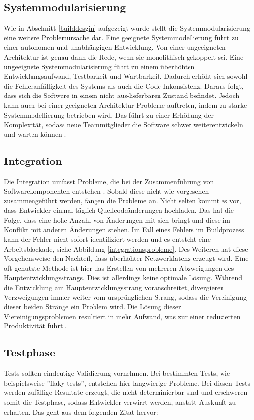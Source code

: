 \subsection{Systemmodularisierung}  \label{Systemmodularisierung}
Wie in Abschnitt \ref{builddesgin} aufgezeigt wurde stellt die Systemmodularisierung eine weitere Problemursache dar. Eine geeignete Systemmodellierung führt zu einer autonomen und unabhängigen Entwicklung. Von einer ungeeigneten Architektur ist genau dann die Rede, wenn sie monolithisch gekoppelt sei. Eine ungeeignete Systemmodularisierung führt zu einem überhöhten Entwicklungsaufwand, Testbarkeit und Wartbarkeit. Dadurch erhöht sich sowohl die Fehleranfälligkeit des Systems als auch die Code-Inkonsistenz. Daraus folgt, dass sich die Software in einem nicht aus-lieferbaren Zustand befindet. Jedoch kann auch bei einer geeigneten Architektur Probleme auftreten, indem zu starke Systemmodellierung betrieben wird. Das führt zu einer Erhöhung der Komplexität, sodass neue Teammitglieder die Software schwer weiterentwickeln und warten können \cite{Laukkanen.2017}. 

\subsection{Integration} \label{Integration}
Die Integration umfasst Probleme, die bei der Zusammenführung von Softwarekomponenten entstehen \cite{LianpingEtPaddy.2015}. Sobald diese nicht wie vorgesehen zusammengeführt werden, fangen die Probleme an. Nicht selten kommt es vor, dass Entwickler einmal täglich Quellcodeänderungen hochladen. Das hat die Folge, dass eine hohe Anzahl von Änderungen mit sich bringt und diese im Konflikt mit anderen Änderungen stehen. Im Fall eines Fehlers im Buildprozess kann der Fehler nicht sofort identifiziert werden und es entsteht eine Arbeitsblockade, siehe Abbildung \ref{integrationsprobleme}. Des Weiteren hat diese Vorgehensweise den Nachteil, dass überhöhter Netzwerklatenz erzeugt wird. Eine oft genutzte Methode ist hier das Erstellen von mehreren Abzweigungen des Hauptentwicklungsstrangs. Dies ist allerdings keine optimale Lösung. Während die Entwicklung am Hauptentwicklungsstrang voranschreitet, divergieren Verzweigungen immer weiter vom ursprünglichen Strang, sodass die Vereinigung dieser beiden Stränge ein Problem wird. Die Lösung dieser Viereinigungsproblemen resultiert in mehr Aufwand, was zur einer reduzierten Produktivität führt \cite{Laukkanen.2017}. 

\subsection{Testphase}
Tests sollten eindeutige Validierung vornehmen. Bei bestimmten Tests, wie beispielsweise ''flaky tests'', entstehen hier langwierige Probleme. Bei diesen Tests werden zufällige Resultate erzeugt, die nicht determinierbar sind und erschweren somit die Testphase, sodass Entwickler verwirrt werden, anstatt Auskunft zu erhalten. Das geht aus dem folgenden Zitat hervor: 

